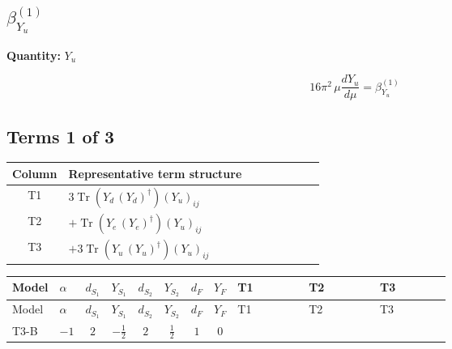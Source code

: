 \documentclass[8pt]{article}
\begin{document}
\begin{landscape}
\section*{$\beta_{Y_u}^{(1)}$}
\noindent\textbf{Quantity: }$Y_u$\par\smallskip
\[16\pi^2\,\mu\frac{d Y_u}{d\mu}=\beta_{Y_u}^{(1)}\]
\subsection*{Terms 1 of 3}
\begin{center}
\begin{tabular}{@{}c >{\raggedright\arraybackslash}p{0.82\linewidth}@{}}
\toprule
Column & Representative term structure \\
\midrule
T1 & \(\displaystyle 3 \operatorname{Tr}\!\left({Y_d}\,\left({Y_d}\right)^{\dagger}\right) \left({Y_u}\right)_{ij}\) \\
\midrule
T2 & \(\displaystyle +\operatorname{Tr}\!\left({Y_e}\,\left({Y_e}\right)^{\dagger}\right) \left({Y_u}\right)_{ij}\) \\
\midrule
T3 & \(\displaystyle +3 \operatorname{Tr}\!\left({Y_u}\,\left({Y_u}\right)^{\dagger}\right) \left({Y_u}\right)_{ij}\) \\
\midrule
\bottomrule
\end{tabular}
\end{center}
\smallskip
\tiny
\begin{longtable}{@{}llcccccc >{\raggedright\arraybackslash}p{0.21\linewidth} >{\raggedright\arraybackslash}p{0.21\linewidth} >{\raggedright\arraybackslash}p{0.21\linewidth}@{}}
\toprule
Model & $\alpha$ & $d_{S_1}$ & $Y_{S_1}$ & $d_{S_2}$ & $Y_{S_2}$ & $d_F$ & $Y_F$ & T1 & T2 & T3 \\
\midrule
\endfirsthead
\toprule
Model & $\alpha$ & $d_{S_1}$ & $Y_{S_1}$ & $d_{S_2}$ & $Y_{S_2}$ & $d_F$ & $Y_F$ & T1 & T2 & T3 \\
\midrule
\endhead
T3-B & $-1$ & $2$ & $-\frac{1}{2}$ & $2$ & $\frac{1}{2}$ & $1$ & $0$ & \scriptsize\adjustbox{max width=\linewidth}{$\begin{gathered} 3 \operatorname{Tr}\!\left({Y_d}\,\left({Y_d}\right)^{\dagger}\right) \left({Y_u}\right)_{ij}\end{gathered}$} & \scriptsize\adjustbox{max width=\linewidth}{$\begin{gathered} +\operatorname{Tr}\!\left({Y_e}\,\left({Y_e}\right)^{\dagger}\right) \left({Y_u}\right)_{ij}\end{gathered}$} & \scriptsize\adjustbox{max width=\linewidth}{$\begin{gathered} +3 \operatorname{Tr}\!\left({Y_u}\,\left({Y_u}\right)^{\dagger}\right) \left({Y_u}\right)_{ij}\end{gathered}$} \\

\end{longtable}
\end{landscape}
\end{document}
